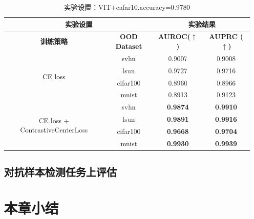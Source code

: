 \begin{table}[H]
	\captionsetup{labelformat=empty}
	\centering
	\renewcommand{\arraystretch}{1.2} %
	\setlength{\tabcolsep}{8pt} %
	\begin{tabular}{|c|c|c|c|}
		\hline
		\multicolumn{2}{|c|}{\textbf{实验设置}} & \multicolumn{2}{c|}{\textbf{实验结果}} \\ 
		\hline
		\textbf{训练策略} & \textbf{OOD Dataset} & \textbf{ AUROC($\uparrow$)} & \textbf{ AUPRC ($\uparrow$)} \\ 
		\hline
		\multirow{4}{*}{CE loss} 
		&	svhn & 0.9007 & 0.9008 \\
		&	lsun &   0.9727 & 0.9716 \\
		&	cifar100 & 0.8960 & 0.8966 \\
		&	mnist   & 0.8913 & 0.9123 \\
		\hline
		\multirow{4}{*}{CE loss + ContrastiveCenterLoss}
		&	svhn&\textbf{0.9874} & \textbf{ 0.9910}\\
		&	lsun & \textbf{0.9891} & \textbf{0.9916} \\
		&	cifar100&  \textbf{0.9668} &\textbf{ 0.9704}\\
		&	mnist  &  \textbf{0.9930} & \textbf{0.9939}\\
		\hline
	\end{tabular}
	\caption{实验设置：VIT+cafar10,accuracy=0.9780}
\end{table}

\subsection{对抗样本检测任务上评估}
\section{本章小结}